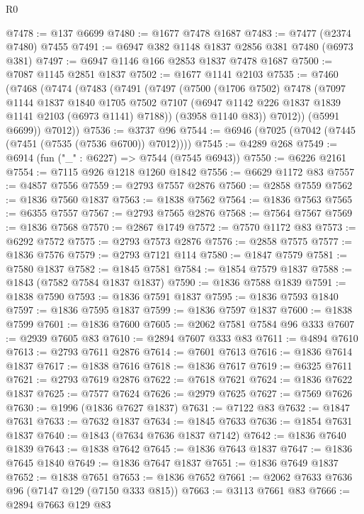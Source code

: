 \begin{lexlean}{R0}
\begin{coremodule}
@7478 := @137 @6699
@7480 := @1677 @7478 @1687
@7483 := @7477 (@2374 @7480) @7455
@7491 := @6947 @382 @1148 @1837 @2856 @381 @7480 (@6973 @381)
@7497 := @6947 @1146 @166 @2853 @1837 @7478 @1687
@7500 := @7087 @1145 @2851 @1837
@7502 := @1677 @1141 @2103
@7535 := @7460
    (@7468
      (@7474
        (@7483
          (@7491
            (@7497
              (@7500
                (@1706 @7502)
                @7478
                (@7097
                  @1144
                  @1837
                  @1840
                  @1705
                  @7502
                  @7107
                  (@6947 @1142 @226 @1837 @1839 @1141 @2103 (@6973 @1141) @7188))
                (@3958 @1140 @83))
              @7012))
          (@5991 @6699))
        @7012))
@7536 := @3737 @96
@7544 := @6946 (@7025 (@7042 (@7445 (@7451 (@7535 (@7536 @6700)) @7012))))
@7545 := @4289 @268
@7549 := @6914 (fun ("_" : @6227) => @7544 (@7545 @6943))
@7550 := @6226 @2161
@7554 := @7115 @926 @1218 @1260 @1842
@7556 := @6629 @1172 @83
@7557 := @4857 @7556
@7559 := @2793 @7557 @2876
@7560 := @2858 @7559
@7562 := @1836 @7560 @1837
@7563 := @1838 @7562
@7564 := @1836 @7563
@7565 := @6355 @7557
@7567 := @2793 @7565 @2876
@7568 := @7564 @7567
@7569 := @1836 @7568
@7570 := @2867 @1749
@7572 := @7570 @1172 @83
@7573 := @6292 @7572
@7575 := @2793 @7573 @2876
@7576 := @2858 @7575
@7577 := @1836 @7576
@7579 := @2793 @7121 @114
@7580 := @1847 @7579
@7581 := @7580 @1837
@7582 := @1845 @7581
@7584 := @1854 @7579 @1837
@7588 := @1843 (@7582 @7584 @1837 @1837)
@7590 := @1836 @7588 @1839
@7591 := @1838 @7590
@7593 := @1836 @7591 @1837
@7595 := @1836 @7593 @1840
@7597 := @1836 @7595 @1837
@7599 := @1836 @7597 @1837
@7600 := @1838 @7599
@7601 := @1836 @7600
@7605 := @2062 @7581 @7584 @96 @333
@7607 := @2939 @7605 @83
@7610 := @2894 @7607 @333 @83
@7611 := @4894 @7610
@7613 := @2793 @7611 @2876
@7614 := @7601 @7613
@7616 := @1836 @7614 @1837
@7617 := @1838 @7616
@7618 := @1836 @7617
@7619 := @6325 @7611
@7621 := @2793 @7619 @2876
@7622 := @7618 @7621
@7624 := @1836 @7622 @1837
@7625 := @7577 @7624
@7626 := @2979 @7625
@7627 := @7569 @7626
@7630 := @1996 (@1836 @7627 @1837)
@7631 := @7122 @83
@7632 := @1847 @7631
@7633 := @7632 @1837
@7634 := @1845 @7633
@7636 := @1854 @7631 @1837
@7640 := @1843 (@7634 @7636 @1837 @7142)
@7642 := @1836 @7640 @1839
@7643 := @1838 @7642
@7645 := @1836 @7643 @1837
@7647 := @1836 @7645 @1840
@7649 := @1836 @7647 @1837
@7651 := @1836 @7649 @1837
@7652 := @1838 @7651
@7653 := @1836 @7652
@7661 := @2062 @7633 @7636 @96 (@7147 @129 (@7150 @333 @815))
@7663 := @3113 @7661 @83
@7666 := @2894 @7663 @129 @83

\end{coremodule}
\end{lexlean}
